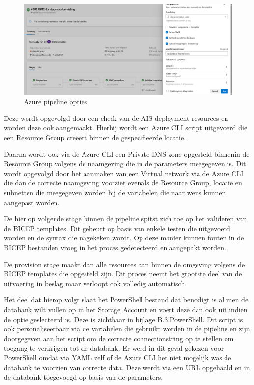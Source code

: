 \begin{figure}
    \centering
    \includegraphics[scale=0.40]{../img/Pipeline.png}
    \caption{\label{fig:Opties}Azure pipeline opties}
\end{figure}

Deze wordt opgevolgd door een check  van de AIS deployment resources en worden deze ook aangemaakt. Hierbij wordt een Azure CLI script uitgevoerd die een Resource Group creëert binnen de gespecifieerde locatie.

Daarna wordt ook via de Azure CLI een Private DNS zone opgesteld binnenin de Resource Group volgens de naamgeving die in de parameters meegegeven is. Dit wordt opgevolgd door het aanmaken van een Virtual network via de Azure CLI die dan de correcte naamgeving voorziet evenals de Resource Group, locatie en subnetten die meegegeven worden bij de variabelen die naar wens kunnen aangepast worden.

De hier op volgende stage binnen de pipeline spitst zich toe op het valideren van de BICEP templates. Dit gebeurt op basis van enkele testen die uitgevoerd worden en de syntax die nagekeken wordt. Op deze manier kunnen fouten in de BICEP bestanden vroeg in het proces gedetecteerd en aangepakt worden.

De provision stage maakt dan alle resources aan binnen de omgeving volgens de BICEP templates die opgesteld zijn. Dit proces neemt het grootste deel van de uitvoering in beslag maar verloopt ook volledig automatisch.

Het deel dat hierop volgt slaat het PowerShell bestand dat benodigt is al men de databank wilt vullen op in het Storage Account en voert deze dan ook uit indien de optie geslecteerd is. Deze is zichtbaar in bijlage B.3 PowerShell. Dit script is ook personaliseerbaar via de variabelen die gebruikt worden in de pipeline en zijn doorgegeven aan het script om de correcte connectionstring op te stellen om toegang te verkrijgen tot de databank. Er werd in dit geval gekozen voor PowerShell omdat via YAML zelf of de Azure CLI het niet mogelijk was de databank te voorzien van correcte data. Deze werdt via een URL opgehaald en in de databank toegevoegd op basis van de parameters.

